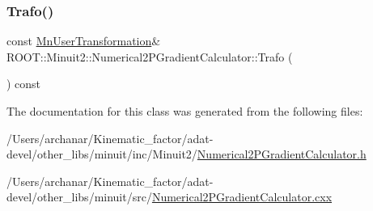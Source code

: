 \subsubsection{\texorpdfstring{Trafo()}{Trafo()}\hspace{0.1cm}{\footnotesize\ttfamily [3/3]}}
{\footnotesize\ttfamily const \mbox{\hyperlink{classROOT_1_1Minuit2_1_1MnUserTransformation}{Mn\+User\+Transformation}}\& R\+O\+O\+T\+::\+Minuit2\+::\+Numerical2\+P\+Gradient\+Calculator\+::\+Trafo (\begin{DoxyParamCaption}{ }\end{DoxyParamCaption}) const\hspace{0.3cm}{\ttfamily [inline]}}



The documentation for this class was generated from the following files\+:\begin{DoxyCompactItemize}
\item 
/\+Users/archanar/\+Kinematic\+\_\+factor/adat-\/devel/other\+\_\+libs/minuit/inc/\+Minuit2/\mbox{\hyperlink{adat-devel_2other__libs_2minuit_2inc_2Minuit2_2Numerical2PGradientCalculator_8h}{Numerical2\+P\+Gradient\+Calculator.\+h}}\item 
/\+Users/archanar/\+Kinematic\+\_\+factor/adat-\/devel/other\+\_\+libs/minuit/src/\mbox{\hyperlink{adat-devel_2other__libs_2minuit_2src_2Numerical2PGradientCalculator_8cxx}{Numerical2\+P\+Gradient\+Calculator.\+cxx}}\end{DoxyCompactItemize}
